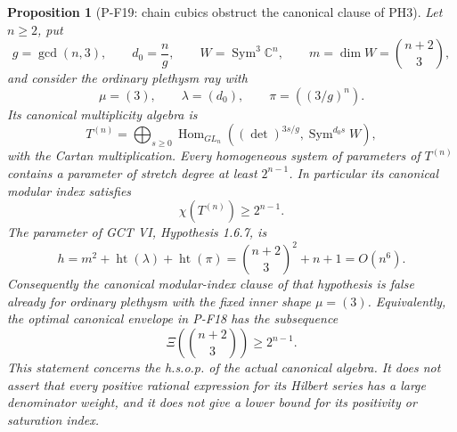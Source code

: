 \documentclass[11pt,a4paper]{article}
\newtheorem{proposition}{Proposition}[section]
\begin{document}
\begin{proposition}[P-F19: chain cubics obstruct the canonical clause of PH3]
\label{prop:cubiccanonicalcounterexample}
Let $n\ge2$, put
\[
 g=\gcd(n,3),\qquad d_0=\frac ng,\qquad
 W=\operatorname{Sym}^3\mathbb C^n,\qquad
 m=\dim W=\binom{n+2}{3},
\]
and consider the ordinary plethysm ray with
\[
 \mu=(3),\qquad \lambda=(d_0),\qquad
 \pi=((3/g)^n).
 \tag{P-F19a}
\]
Its canonical multiplicity algebra is
\[
 T^{(n)}=\bigoplus_{s\ge0}
  \operatorname{Hom}_{GL_n}
  \left((\det)^{3s/g},\operatorname{Sym}^{d_0s}W\right),
 \tag{P-F19b}
\]
with the Cartan multiplication. Every homogeneous system of parameters
of $T^{(n)}$ contains a parameter of stretch degree at least
$2^{n-1}$. In particular its canonical modular index satisfies
\[
 \chi(T^{(n)})\ge2^{n-1}.
 \tag{P-F19c}
\]
The parameter of GCT VI, Hypothesis 1.6.7, is
\[
 h=m^2+\operatorname{ht}(\lambda)+\operatorname{ht}(\pi)
   =\binom{n+2}{3}^{\!2}+n+1=O(n^6).
 \tag{P-F19d}
\]
Consequently the canonical modular-index clause of that hypothesis
is false already for ordinary plethysm with the fixed inner shape
$\mu=(3)$. Equivalently, the optimal canonical envelope in P-F18
has the subsequence
\[
 \Xi\!\left(\binom{n+2}{3}\right)\ge2^{n-1}.
 \tag{P-F19e}
\]
This statement concerns the h.s.o.p. of the actual canonical algebra.
It does not assert that every positive rational expression for its
Hilbert series has a large denominator weight, and it does not give
a lower bound for its positivity or saturation index.
\end{proposition}
\end{document}
